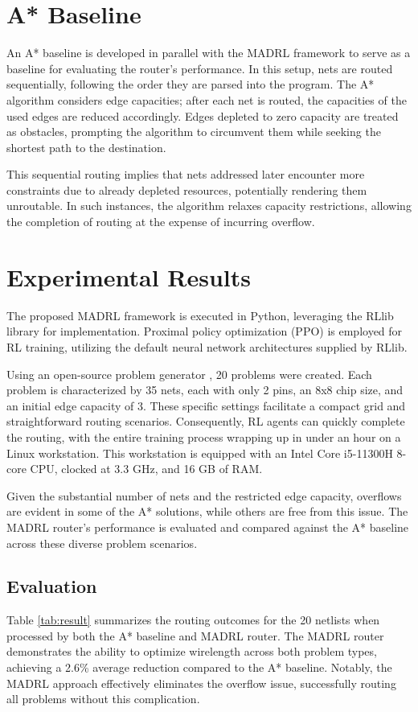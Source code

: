 \documentclass[conference]{IEEEtran}
\begin{document}
\section{A* Baseline}
An A* baseline is developed in parallel with the MADRL framework to serve as a baseline for evaluating the router’s performance. In this setup, nets are routed sequentially, following the order they are parsed into the program. The A* algorithm considers edge capacities; after each net is routed, the capacities of the used edges are reduced accordingly. Edges depleted to zero capacity are treated as obstacles, prompting the algorithm to circumvent them while seeking the shortest path to the destination.

This sequential routing implies that nets addressed later encounter more constraints due to already depleted resources, potentially rendering them unroutable. In such instances, the algorithm relaxes capacity restrictions, allowing the completion of routing at the expense of incurring overflow.

\section{Experimental Results}
The proposed MADRL framework is executed in Python, leveraging the RLlib library for implementation. Proximal policy optimization (PPO) \cite{Schulman2017} is employed for RL training, utilizing the default neural network architectures supplied by RLlib.

Using an open-source problem generator \cite{Liao2020}, 20 problems were created. Each problem is characterized by 35 nets, each with only 2 pins, an 8x8 chip size, and an initial edge capacity of 3. These specific settings facilitate a compact grid and straightforward routing scenarios. Consequently, RL agents can quickly complete the routing, with the entire training process wrapping up in under an hour on a Linux workstation. This workstation is equipped with an Intel Core i5-11300H 8-core CPU, clocked at 3.3 GHz, and 16 GB of RAM.

Given the substantial number of nets and the restricted edge capacity, overflows are evident in some of the A* solutions, while others are free from this issue. The MADRL router's performance is evaluated and compared against the A* baseline across these diverse problem scenarios.

\subsection{Evaluation}
Table \ref{tab:result} summarizes the routing outcomes for the 20 netlists when processed by both the A* baseline and MADRL router. The MADRL router demonstrates the ability to optimize wirelength across both problem types, achieving a 2.6\% average reduction compared to the A* baseline. Notably, the MADRL approach effectively eliminates the overflow issue, successfully routing all problems without this complication.
\end{document}
